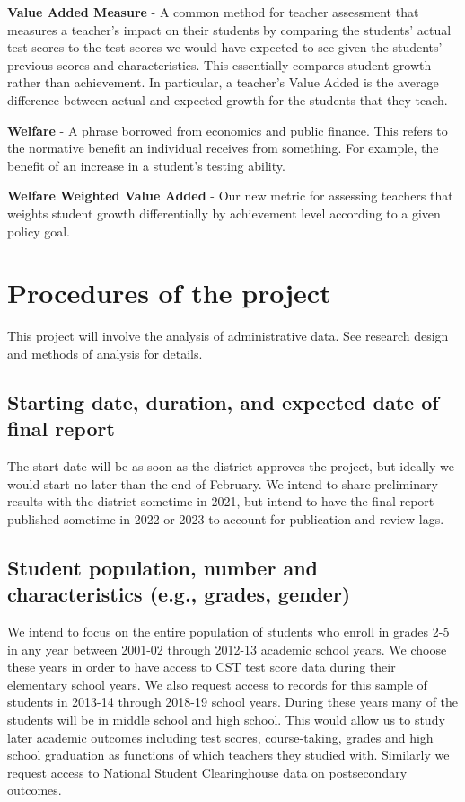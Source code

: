 \documentclass[letterpaper,12pt]{article}
\begin{document}
\noindent \textbf{Value Added Measure} - A common method for teacher assessment that measures a teacher's impact on their students by comparing the students' actual test scores to the test scores we would have expected to see given the students' previous scores and characteristics. This essentially compares student growth rather than achievement. In particular, a teacher's Value Added is the average difference between actual and expected growth for the students that they teach.

\noindent \textbf{Welfare} - A phrase borrowed from economics and public finance. This refers to the normative benefit an individual receives from something. For example, the benefit of an increase in a student's testing ability. 

\noindent \textbf{Welfare Weighted Value Added} - Our new metric for assessing teachers that weights student growth differentially by achievement level according to a given policy goal.





\section{Procedures of the project}
This project will involve the analysis of administrative data. See research design and methods of analysis for details. 



\subsection{Starting date, duration, and expected date of final report}
The start date will be as soon as the district approves the project, but ideally we would start no later than the end of February. We intend to share preliminary results with the district sometime in 2021, but intend to have the final report published sometime in 2022 or 2023 to account for publication and review lags.



\subsection{Student population, number and characteristics (e.g., grades, gender)}
We intend to focus on the entire population of students who enroll in grades 2-5 in any year between 2001-02 through 2012-13 academic school years. We choose these years in order to have access to CST test score data during their elementary school years. We also request access to records for this sample of students in 2013-14 through 2018-19 school years. During these years many of the students will be in  middle school and high school. This would allow us to study later academic outcomes including test scores, course-taking, grades and high school graduation as functions of which teachers they studied with. Similarly we request access to National Student Clearinghouse data on postsecondary outcomes.
\end{document}
